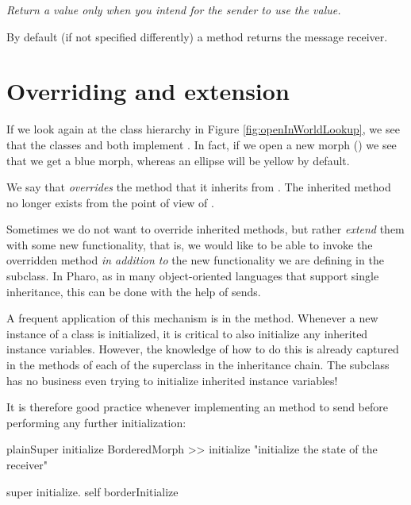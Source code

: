 \documentclass[10pt,twoside,english]{_support/latex/sbabook/sbabook}
\begin{document}
\textit{Return a value only when you intend for the sender to use the value.}

\begin{important}
By default (if not specified differently) a method returns the message receiver.
\end{important}
\section{Overriding and extension}
If we look again at the  class hierarchy in Figure
\ref{fig:openInWorldLookup}, we see that the classes  and 
both implement . In fact, if we open a new morph () we see that we get a blue morph, whereas an ellipse will be
yellow by default.

We say that  \textit{overrides} the  method that it
inherits from . The inherited method no longer exists from the point of
view of .

Sometimes we do not want to override inherited methods, but rather \textit{extend}
them with some new functionality, that is, we would like to be able to invoke
the overridden method \textit{in addition to} the new functionality we are defining
in the subclass. In Pharo, as in many object-oriented languages that support
single inheritance, this can be done with the help of  sends.

A frequent application of this mechanism is in the  method.
Whenever a new instance of a class is initialized, it is critical to also
initialize any inherited instance variables. However, the knowledge of how to do
this is already captured in the  methods of each of the superclass
in the inheritance chain. The subclass has no business even trying to initialize
inherited instance variables!

It is therefore good practice whenever implementing an  method to
send  before performing any further initialization:

\begin{listing}[float, label=scr:morphinit]{plain}{Super initialize}
BorderedMorph >> initialize
    "initialize the state of the receiver"

    super initialize.
    self borderInitialize
\end{listing}
\end{document}
